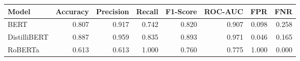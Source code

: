 \begin{tabular}{|l||r|r|r|r|r|r|r|}
\toprule
Model & \textbf{Accuracy} & \textbf{Precision} & Recall & \textbf{F1-Score} & \textbf{ROC-AUC} & \textbf{FPR} & FNR \\
\midrule \midrule
BERT & 0.807 & 0.917 & 0.742 & 0.820 & 0.907 & 0.098 & 0.258 \\
DistilliBERT & 0.887 & 0.959 & 0.835 & 0.893 & 0.971 & 0.046 & 0.165 \\
RoBERTa & 0.613 & 0.613 & 1.000 & 0.760 & 0.775 & 1.000 & 0.000 \\
\bottomrule
\end{tabular}
